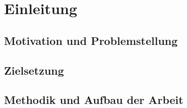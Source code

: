 
\chapter{Einleitung}

\section{Motivation und Problemstellung}

\section{Zielsetzung}

\section{Methodik und Aufbau der Arbeit}